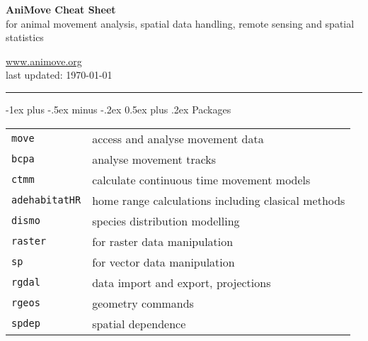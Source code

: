 \documentclass[a4paper,10pt,landscape]{article}
\makeatletter
\renewcommand{\section}{\@startsection{section}{1}{0mm}%
                                {-1ex plus -.5ex minus -.2ex}%
                                {0.5ex plus .2ex}%
                                {\normalfont\large\bfseries}}
\makeatother
\begin{document}
\newlength{\MyLen}


\raggedright
\footnotesize
\begin{multicols}{3}


\setlength{\premulticols}{1pt}
\setlength{\postmulticols}{1pt}
\setlength{\multicolsep}{1pt}
\setlength{\columnsep}{2pt}

\begin{center}
     \Large{\textbf{AniMove Cheat Sheet}} \\
     for animal movement analysis, spatial data handling, remote sensing and spatial statistics
\end{center}



\url{www.animove.org}\\
last updated: \today

\rule{0.32\textwidth}{0.4pt}


\section{Packages}
\begin{tabular}{@{}p{\the\MyLen}%
		@{}p{\linewidth-\the\MyLen}@{}}
\verb!move!  & access and analyse movement data\\
\verb!bcpa!  & analyse movement tracks\\
\verb!ctmm!  & calculate continuous time movement models\\
\verb!adehabitatHR! & home range calculations including clasical methods\\
\verb!dismo!  &  species distribution modelling \\
\verb!raster!    & for raster data manipulation \\
\verb!sp!     & for vector data manipulation \\
\verb!rgdal!  & data import and export, projections \\
\verb!rgeos!  & geometry commands \\
\verb!spdep!  & spatial dependence \\


\end{tabular}
\end{multicols}
\end{document}
